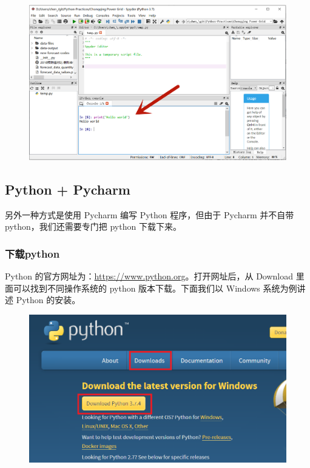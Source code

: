 \begin{figure}[!ht]
  \centering
  \includegraphics[scale=0.4]{figure/chapter1/anaconda5.png}
\end{figure}


\clearpage
\subsection{Python + Pycharm}

另外一种方式是使用 Pycharm 编写 Python 程序，但由于 Pycharm 并不自带 python，我们还需要专门把 python 下载下来。

\subsubsection{下载python}

Python 的官方网址为：\href{https://www.python.org}{https://www.python.org}。打开网址后，从 Download 里面可以找到不同操作系统的 python 版本下载。下面我们以 Windows 系统为例讲述 Python 的安装。

\begin{figure}[!ht]
  \centering
  \includegraphics[scale=0.6]{figure/chapter1/pythonDownload.png}
\end{figure}

